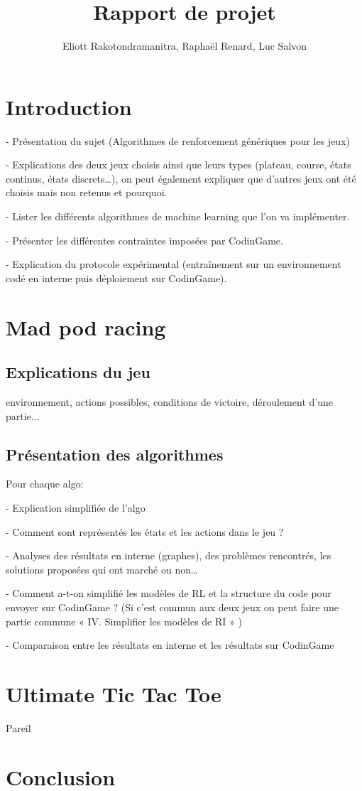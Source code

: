 \documentclass{article}
\title{Rapport de projet}
\author{Eliott Rakotondramanitra, Raphaël Renard, Luc Salvon}
\begin{document}
\maketitle



\section{Introduction}

- Présentation du sujet (Algorithmes de renforcement génériques pour les jeux)

- Explications des deux jeux choisis ainsi que leurs types (plateau, course, états continus, états discrets…), on peut également expliquer que d'autres jeux ont été choisis mais non retenus et pourquoi.

- Lister les différents algorithmes de machine learning que l'on va implémenter.

- Présenter les différentes contraintes imposées par CodinGame.

- Explication du protocole expérimental (entraînement sur un environnement codé en interne puis déploiement sur CodinGame).


\section{Mad pod racing}
\subsection{Explications du jeu}
environnement, actions possibles, conditions de victoire, déroulement d'une partie...

\subsection{Présentation des algorithmes}
Pour chaque algo:

-	Explication simplifiée de l'algo

-	Comment sont représentés les états et les actions dans le jeu ?

-	Analyses des résultats en interne (graphes), des problèmes rencontrés, les solutions proposées qui ont marché ou non…

-	Comment a-t-on simplifié les modèles de RL et la structure du code pour envoyer sur CodinGame ? (Si c'est commun aux deux jeux on peut faire une partie commune « IV. Simplifier les modèles de RI » )

-	Comparaison entre les résultats en interne et les résultats sur CodinGame


\section{Ultimate Tic Tac Toe}
Pareil


\section{Conclusion}


\nocite{*}
\printbibliography 
\end{document}
